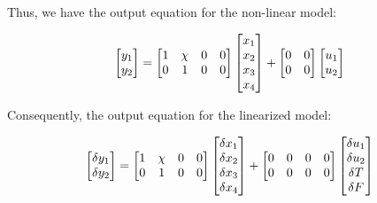 Thus, we have the output equation for the non-linear model:

\begin{equation}\label{eqn::ctrl_out}
    \begin{bmatrix} y_1 \\ y_2 \end{bmatrix} = \begin{bmatrix} 1 & \chi & 0 & 0 \\
                                 0 & 1       & 0 & 0 \end{bmatrix}
                            \begin{bmatrix} x_1 \\ x_2 \\ x_3 \\ x_4 \end{bmatrix} +
                            \begin{bmatrix} 0 & 0 \\
                                0 & 0 \\ \end{bmatrix}
                            \begin{bmatrix} u_1 \\ u_2 \end{bmatrix}
\end{equation}

Consequently, the output equation for the linearized model:

\begin{equation}\label{eqn::lin_out}
    \begin{bmatrix} \delta y_1 \\ \delta y_2 \end{bmatrix} = \begin{bmatrix} 1 & \chi & 0 & 0 \\
                                 0 & 1       & 0 & 0 \end{bmatrix}
                            \begin{bmatrix} \delta x_1 \\ \delta x_2 \\ \delta x_3 \\ \delta x_4 \end{bmatrix} +
                            \begin{bmatrix} 0 & 0 & 0 & 0\\
                                0 & 0 & 0 & 0
                                 \end{bmatrix}
                            \begin{bmatrix} \delta u_1 \\ \delta u_2 \\ \delta T \\ \delta F \end{bmatrix}
\end{equation}

